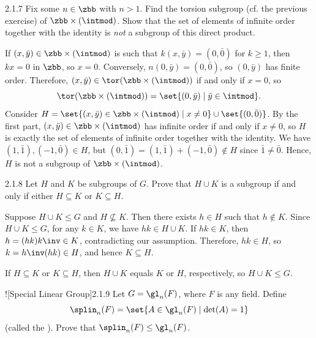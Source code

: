 \begin{exercise}{2.1.7}
    Fix some $n \in \zbb$ with $n>1$.
	Find the torsion subgroup (cf. the previous exercise) of $\zbb \times (\intmod)$.
	Show that the set of elements of infinite order together with the identity is \emph{not} a subgroup of this direct product.
\end{exercise}

\begin{sol}
	If $(x, \bar y) \in \zbb \times (\intmod)$ is such that $k(x, \bar y) = (0, \bar 0)$ for $k \geq 1$, then $kx = 0$ in $\zbb$, so $x = 0$.
    Conversely, $n(0, \bar y) = (0, \bar 0)$, so $(0, \bar y)$ has finite order.
    Therefore, $(x, \bar y) \in \tor(\zbb \times (\intmod))$ if and only if $x = 0$, so
    \[
    	\tor(\zbb \times (\intmod)) = \set{(0, \bar y) \mid \bar y \in \intmod}.
    \]
    Consider $H = \set{(x, \bar y) \in \zbb \times (\intmod) \mid x \neq 0} \cup \set{(0, \bar 0)}$.
    By the first part, $(x, \bar y) \in \zbb \times (\intmod)$ has infinite order if and only if $x \neq 0$, so $H$ is exactly the set of elements of infinite order together with the identity.
	We have $(1, \bar 1), (-1, \bar 0) \in H$, but $(0, \bar 1) = (1, \bar 1) + (-1, \bar 0) \notin H$ since $\bar 1 \neq \bar 0$.
	Hence, $H$ is not a subgroup of $\zbb \times (\intmod)$.
\end{sol}

\begin{exercise}{2.1.8}
    Let $H$ and $K$ be subgroups of $G$.
	Prove that $H \cup K$ is a subgroup if and only if either $H \subseteq K$ or $K \subseteq H$.
\end{exercise}

\begin{soliff}
    \rightimp Suppose $H \cup K \leq G$ and $H \nsubseteq K$.
	Then there exists $h \in H$ such that $h \notin K$.
	Since $H \cup K \leq G$, for any $k \in K$, we have $hk \in H \cup K$.
	If $hk \in K$, then $h = (hk)k\inv \in K$, contradicting our assumption.
	Therefore, $hk \in H$, so $k = h\inv(hk) \in H$, and hence $K \subseteq H$.

    \leftimp If $H \subseteq K$ or $K \subseteq H$, then $H \cup K$ equals $K$ or $H$, respectively, so $H \cup K \leq G$.
\end{soliff}

\begin{exercise}![Special Linear Group]{2.1.9}
    Let $G = \gl_n(F)$, where $F$ is any field.
	Define
    \[
    	\splin_n(F) = \set{ A \in \gl_n(F) \mid \det(A) = 1 }
    \]
    (called the ).
	Prove that $\splin_n(F) \leq \gl_n(F)$.
\end{exercise}

